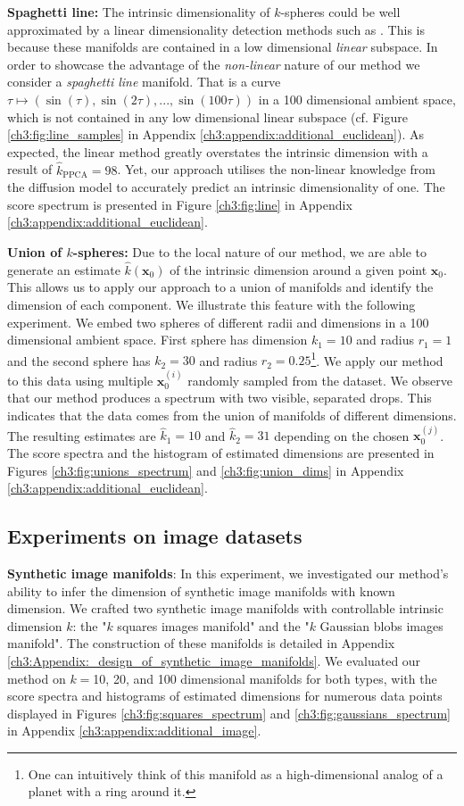 \textbf{Spaghetti line:} The intrinsic dimensionality of $k$-spheres could be well approximated by a linear dimensionality detection methods such as \cite{auto_ppca}. This is because these manifolds are contained in a low dimensional \textit{linear} subspace. In order to showcase the advantage of the \textit{non-linear} nature of our method we consider a \textit{spaghetti line} manifold. That is a curve $\tau \mapsto (\sin(\tau), \sin(2\tau), ..., \sin(100\tau))$ in a 100 dimensional ambient space, which is not contained in any low dimensional linear subspace (cf. Figure \ref{ch3:fig:line_samples} in Appendix \ref{ch3:appendix:additional_euclidean}). As expected, the linear method \cite{auto_ppca} greatly overstates the intrinsic dimension with a result of $\hat{k}_{\text{PPCA}}=98$. Yet, our approach utilises the non-linear knowledge from the diffusion model to accurately predict an intrinsic dimensionality of one.  The score spectrum is presented in Figure \ref{ch3:fig:line} in Appendix \ref{ch3:appendix:additional_euclidean}.


\textbf{Union of $k$-spheres:} Due to the local nature of our method, we are able to generate an estimate $\hat{k}(\textbf{x}_0)$ of the intrinsic dimension around a given point $\textbf{x}_0$. This allows us to apply our approach to a union of manifolds and identify the dimension of each component. We illustrate this feature with the following experiment. We embed two spheres of different radii and dimensions in a 100 dimensional ambient space. First sphere has dimension $k_1 = 10$ and radius $r_1 = 1$ and the second sphere has $k_2=30$ and radius $r_2 = 0.25$\footnote{One can intuitively think of this manifold as a high-dimensional analog of a planet with a ring around it.}. We apply our method to this data using multiple $\textbf{x}_0^{(i)}$ randomly sampled from the dataset. We observe that our method produces a spectrum with two visible, separated drops. This indicates that the data comes from the union of manifolds of different dimensions. The resulting estimates are $\hat{k}_1 = 10$ and $\hat{k}_2=31$ depending on the chosen  $\textbf{x}_0^{(j)}$. The score spectra and the histogram of estimated dimensions are presented in Figures \ref{ch3:fig:unions_spectrum} and \ref{ch3:fig:union_dims} in Appendix \ref{ch3:appendix:additional_euclidean}.

\subsection{Experiments on image datasets}
\textbf{Synthetic image manifolds}: In this experiment, we investigated our method's ability to infer the dimension of synthetic image manifolds with known dimension. We crafted two synthetic image manifolds with controllable intrinsic dimension $k$: the "$k$ squares images manifold" and the "$k$ Gaussian blobs images manifold". The construction of these manifolds is detailed in Appendix \ref{ch3:Appendix:_design_of_synthetic_image_manifolds}. We evaluated our method on $k=$10, 20, and 100 dimensional manifolds for both types, with the score spectra and histograms of estimated dimensions for numerous data points displayed in Figures \ref{ch3:fig:squares_spectrum} and \ref{ch3:fig:gaussians_spectrum} in Appendix \ref{ch3:appendix:additional_image}.



